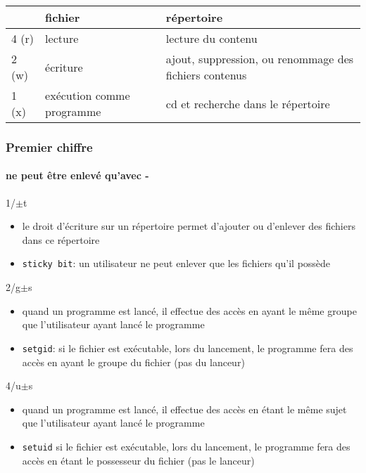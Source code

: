 \begin{reveals}
\begin{frame}
  \vfill
  \begin{center}
    \begin{tabular}{|l|p{}|p{}|}
      \hline
      & fichier & répertoire \\\hline
      4 (r) & lecture & lecture du contenu\\\hline
      2 (w) & écriture & ajout, suppression, ou renommage
      des fichiers contenus\\\hline
      1 (x) & exécution comme programme & cd et recherche
      dans le répertoire\\\hline
    \end{tabular}
  \end{center}
  \vfill
\end{frame}

\begin{frame}
  \frametitle{Premier chiffre}
  \framesubtitle{ne peut être enlevé qu'avec -}

  \vfill
  \begin{block}{1/\(\pm\)t}
    \begin{itemize}
    \item le droit d'écriture sur un répertoire permet d'ajouter ou
      d'enlever des fichiers dans ce répertoire
    \item \texttt{sticky bit}: un utilisateur ne peut enlever que les
      fichiers qu'il possède
    \end{itemize}
  \end{block}
  \vfill
  \begin{block}{2/g\(\pm\)s}
    \begin{itemize}
    \item quand un programme est lancé, il effectue des accès en ayant
      le même groupe que l'utilisateur ayant lancé le programme
    \item \texttt{setgid}: si le fichier est exécutable, lors du
      lancement, le programme fera des accès en ayant le groupe du
      fichier (pas du lanceur)
    \end{itemize}
  \end{block}
  \vfill
  \begin{block}{4/u\(\pm\)s}
    \begin{itemize}
    \item quand un programme est lancé, il effectue des accès en étant
      le même sujet que l'utilisateur ayant lancé le programme
    \item \texttt{setuid} si le fichier est exécutable, lors du
      lancement, le programme fera des accès en étant le possesseur du
      fichier (pas le lanceur)
    \end{itemize}
  \end{block}


\end{frame}
\end{reveals}
